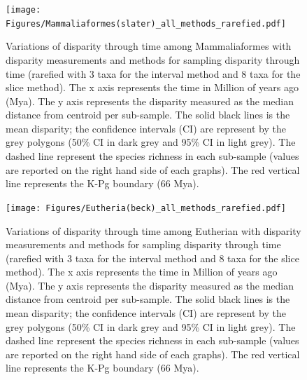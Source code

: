 \documentclass[12pt,letterpaper]{article}
\begin{document}
\begin{landscape}
\begin{figure}[!htbp]
\centering
    \texttt{[image: Figures/Mammaliaformes(slater)\_all\_methods\_rarefied.pdf]}
\caption{Variations of disparity through time among Mammaliaformes with disparity measurements and methods for sampling disparity through time (rarefied with 3 taxa for the interval method and 8 taxa for the slice method). The x axis represents the time in Million of years ago (Mya). The y axis represents the disparity measured as the median distance from centroid per sub-sample. The solid black lines is the mean disparity; the confidence intervals (CI) are represent by the grey polygons (50\% CI in dark grey and 95\% CI in light grey). The dashed line represent the species richness in each sub-sample (values are reported on the right hand side of each graphs). The red vertical line represents the K-Pg boundary (66 Mya).}
\end{figure}
\end{landscape}

\begin{landscape}
\begin{figure}[!htbp]
\centering
    \texttt{[image: Figures/Eutheria(beck)\_all\_methods\_rarefied.pdf]}
\caption{Variations of disparity through time among Eutherian with disparity measurements and methods for sampling disparity through time (rarefied with 3 taxa for the interval method and 8 taxa for the slice method). The x axis represents the time in Million of years ago (Mya). The y axis represents the disparity measured as the median distance from centroid per sub-sample. The solid black lines is the mean disparity; the confidence intervals (CI) are represent by the grey polygons (50\% CI in dark grey and 95\% CI in light grey). The dashed line represent the species richness in each sub-sample (values are reported on the right hand side of each graphs). The red vertical line represents the K-Pg boundary (66 Mya).}
\end{figure}
\end{landscape}
\end{document}
